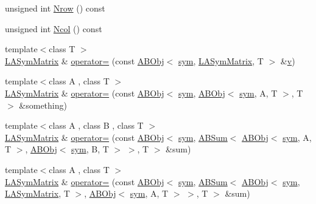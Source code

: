 \begin{DoxyCompactItemize}
unsigned int \mbox{\hyperlink{classROOT_1_1Minuit2_1_1LASymMatrix_ac76b44933bc4b144b8671c089b8d7ef5}{Nrow}} () const
\item 
unsigned int \mbox{\hyperlink{classROOT_1_1Minuit2_1_1LASymMatrix_a36bb0f349110a80cb742953ae68fc9c5}{Ncol}} () const
\item 
{\footnotesize template$<$class T $>$ }\\\mbox{\hyperlink{classROOT_1_1Minuit2_1_1LASymMatrix}{L\+A\+Sym\+Matrix}} \& \mbox{\hyperlink{classROOT_1_1Minuit2_1_1LASymMatrix_a6c1a413ac701804116e0e395334edc3b}{operator=}} (const \mbox{\hyperlink{classROOT_1_1Minuit2_1_1ABObj}{A\+B\+Obj}}$<$ \mbox{\hyperlink{classROOT_1_1Minuit2_1_1sym}{sym}}, \mbox{\hyperlink{classROOT_1_1Minuit2_1_1LASymMatrix}{L\+A\+Sym\+Matrix}}, T $>$ \&\mbox{\hyperlink{adat__devel_2lib_2hadron_2hadron__timeslice_8cc_a716fc87f5e814be3ceee2405ed6ff22a}{v}})
\item 
{\footnotesize template$<$class A , class T $>$ }\\\mbox{\hyperlink{classROOT_1_1Minuit2_1_1LASymMatrix}{L\+A\+Sym\+Matrix}} \& \mbox{\hyperlink{classROOT_1_1Minuit2_1_1LASymMatrix_ad9610e3f4b18a52ab16644373e179acc}{operator=}} (const \mbox{\hyperlink{classROOT_1_1Minuit2_1_1ABObj}{A\+B\+Obj}}$<$ \mbox{\hyperlink{classROOT_1_1Minuit2_1_1sym}{sym}}, \mbox{\hyperlink{classROOT_1_1Minuit2_1_1ABObj}{A\+B\+Obj}}$<$ \mbox{\hyperlink{classROOT_1_1Minuit2_1_1sym}{sym}}, A, T $>$, T $>$ \&something)
\item 
{\footnotesize template$<$class A , class B , class T $>$ }\\\mbox{\hyperlink{classROOT_1_1Minuit2_1_1LASymMatrix}{L\+A\+Sym\+Matrix}} \& \mbox{\hyperlink{classROOT_1_1Minuit2_1_1LASymMatrix_a88d40828624a6418f8b94e239e30d322}{operator=}} (const \mbox{\hyperlink{classROOT_1_1Minuit2_1_1ABObj}{A\+B\+Obj}}$<$ \mbox{\hyperlink{classROOT_1_1Minuit2_1_1sym}{sym}}, \mbox{\hyperlink{classROOT_1_1Minuit2_1_1ABSum}{A\+B\+Sum}}$<$ \mbox{\hyperlink{classROOT_1_1Minuit2_1_1ABObj}{A\+B\+Obj}}$<$ \mbox{\hyperlink{classROOT_1_1Minuit2_1_1sym}{sym}}, A, T $>$, \mbox{\hyperlink{classROOT_1_1Minuit2_1_1ABObj}{A\+B\+Obj}}$<$ \mbox{\hyperlink{classROOT_1_1Minuit2_1_1sym}{sym}}, B, T $>$ $>$, T $>$ \&sum)
\item 
{\footnotesize template$<$class A , class T $>$ }\\\mbox{\hyperlink{classROOT_1_1Minuit2_1_1LASymMatrix}{L\+A\+Sym\+Matrix}} \& \mbox{\hyperlink{classROOT_1_1Minuit2_1_1LASymMatrix_abaf8a2feeb04c66aca17e5876dd7aaff}{operator=}} (const \mbox{\hyperlink{classROOT_1_1Minuit2_1_1ABObj}{A\+B\+Obj}}$<$ \mbox{\hyperlink{classROOT_1_1Minuit2_1_1sym}{sym}}, \mbox{\hyperlink{classROOT_1_1Minuit2_1_1ABSum}{A\+B\+Sum}}$<$ \mbox{\hyperlink{classROOT_1_1Minuit2_1_1ABObj}{A\+B\+Obj}}$<$ \mbox{\hyperlink{classROOT_1_1Minuit2_1_1sym}{sym}}, \mbox{\hyperlink{classROOT_1_1Minuit2_1_1LASymMatrix}{L\+A\+Sym\+Matrix}}, T $>$, \mbox{\hyperlink{classROOT_1_1Minuit2_1_1ABObj}{A\+B\+Obj}}$<$ \mbox{\hyperlink{classROOT_1_1Minuit2_1_1sym}{sym}}, A, T $>$ $>$, T $>$ \&sum)

\end{DoxyCompactItemize}
